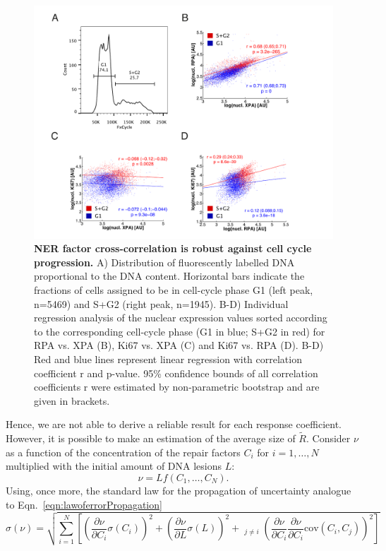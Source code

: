 \begin{figure}[t]
	\begin{center}
		\includegraphics[width=1\textwidth]{Abbildungen/figureTAC_4.pdf}
		\caption{\textbf{NER factor cross-correlation is robust against cell cycle progression.} A) Distribution of fluorescently labelled DNA proportional to the DNA content. Horizontal bars indicate the fractions of cells assigned to be in cell-cycle phase G1 (left peak, n=5469) and S+G2 (right peak, n=1945).  B-D) Individual regression analysis of the nuclear expression values sorted according to the corresponding cell-cycle phase (G1 in blue; S+G2 in red) for RPA vs. XPA (B), Ki67 vs. XPA (C) and Ki67 vs. RPA (D). B-D) Red and blue lines represent linear regression with correlation coefficient r and p-value. 95\% confidence bounds of all correlation coefficients r were estimated by non-parametric bootstrap and are given in brackets.}
		\label{fig:FC_cell_cycle}
	\end{center}
\end{figure}  
Hence, we are not able to derive a reliable result for each response coefficient. However, it is possible to make an estimation of the average size of $\tilde{R}$. Consider $\nu$ as a function of the concentration of the repair factors $C_i$ for $i=1,\ldots,N$ multiplied with the initial amount of DNA lesions $L$:
\begin{equation}
	\nu = Lf(C_1,\ldots,C_N).
\end{equation}
Using, once more, the standard law for the propagation of uncertainty analogue to Eqn.\ \ref{eqn:lawoferrorPropagation}
 \begin{equation}
 \sigma(\nu) = \sqrt{\sum_{i=1}^{N}\left[\left(\frac{\partial \nu}{\partial C_i}\sigma(C_i) \right)^2 + \left(\frac{\partial \nu}{\partial L}\sigma(L)\right)^2 + \mathop{\sum_{j=1}^{N}}_{j\neq i}\left(\frac{\partial \nu}{\partial C_i} \frac{\partial \nu}{\partial C_i}\textrm{cov}(C_i,C_j)\right)^2\right]}
 \end{equation}  
 
